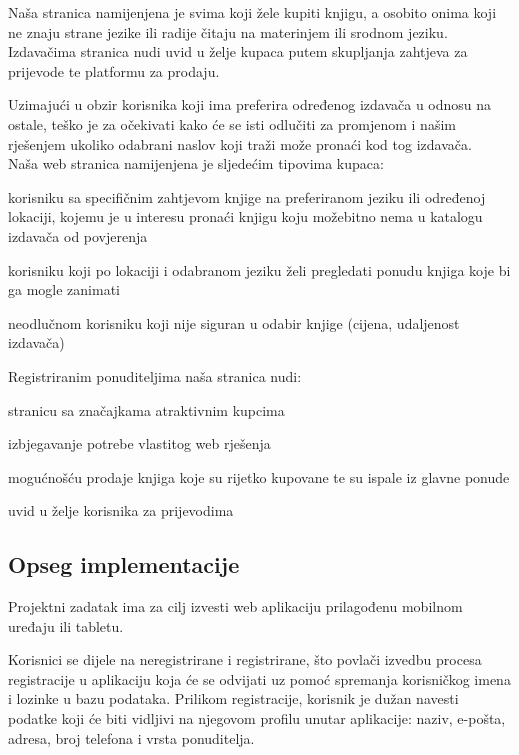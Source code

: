 		Naša stranica namijenjena je svima koji žele kupiti knjigu, a osobito onima koji ne znaju strane jezike ili radije čitaju na materinjem ili srodnom jeziku. Izdavačima stranica nudi uvid u želje kupaca putem skupljanja zahtjeva za prijevode te platformu za prodaju.
		
		Uzimajući u obzir korisnika koji ima preferira određenog izdavača u odnosu na ostale, teško je za očekivati kako će se isti odlučiti za promjenom i našim rješenjem ukoliko odabrani naslov koji traži može pronaći kod tog izdavača.\\
		
		\noindent
		Naša web stranica namijenjena je sljedećim tipovima kupaca:
		
		\begin{packed_enum}
			\item korisniku sa specifičnim zahtjevom knjige na preferiranom jeziku ili određenoj lokaciji, kojemu je u interesu pronaći knjigu koju možebitno nema u katalogu izdavača od povjerenja
			\item korisniku koji po lokaciji i odabranom jeziku želi pregledati ponudu knjiga koje bi ga mogle zanimati
			\item neodlučnom korisniku koji nije siguran u odabir knjige (cijena, udaljenost izdavača)
		\end{packed_enum}
		
		\noindent
		Registriranim ponuditeljima naša stranica nudi:	
		
		\begin{packed_enum}
			\item stranicu sa značajkama atraktivnim kupcima
			\item izbjegavanje potrebe vlastitog web rješenja
			\item mogućnošću prodaje knjiga koje su rijetko kupovane te su ispale iz glavne ponude
			\item uvid u želje korisnika za prijevodima
		\end{packed_enum}
		
		\subsection*{Opseg implementacije}
		
		Projektni zadatak ima za cilj izvesti web aplikaciju prilagođenu mobilnom uređaju ili tabletu.
		
		Korisnici se dijele na neregistrirane i registrirane, što povlači izvedbu procesa registracije u aplikaciju koja će se odvijati uz pomoć spremanja korisničkog imena i lozinke u bazu podataka. Prilikom registracije, korisnik je dužan navesti podatke koji će biti vidljivi na njegovom profilu unutar aplikacije: naziv, e-pošta, adresa, broj telefona i vrsta ponuditelja.
		
